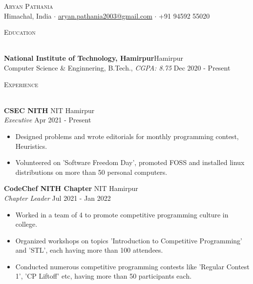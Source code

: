 \documentclass[a4paper]{article}
\newcommand{\lineunder} {
    \vspace*{-8pt} \\
    \hspace*{-18pt} \hrulefill \\
}
\newcommand{\header} [1] {
    {\hspace*{-18pt}\vspace*{6pt} \textsc{#1}}
    \vspace*{-6pt} \lineunder
}
\begin{document}

\begin{center}
	{\Huge \scshape {Aryan Pathania}}\\
	Himachal, India $\cdot$ \href{mailto: aryan.pathania2003@gmail.com}{aryan.pathania2003@gmail.com} $\cdot$ +91 94592 55020\\
\end{center}

\vspace{1.5mm}

\header{Education}
\vspace{1mm}

\textbf{National Institute of Technology, Hamirpur}\hfill Hamirpur\\
Computer Science \& Enginnering, B.Tech., \textit{CGPA: 8.75} \hfill Dec 2020 - Present\\
\vspace{1.5mm}



\header{Experience}
\vspace{1mm}

\textbf{CSEC NITH} \hfill NIT Hamirpur\\
\textit{Executive} \hfill Apr 2021 - Present\\
\begin{itemize}
	\item Designed problems and wrote editorials for monthly programming contest, Heuristics.
	\item Volunteered on 'Software Freedom Day', promoted FOSS and installed linux distributions on more than 50 personal computers.
\end{itemize}
\vspace{1.5mm}

\textbf{CodeChef NITH Chapter} \hfill NIT Hamirpur\\
\textit{Chapter Leader} \hfill Jul 2021 - Jan 2022\\
\begin{itemize}
    \item Worked in a team of 4 to promote competitive programming culture in college.
	\item Organized workshops on topics 'Introduction to Competitive Programming' and 'STL', each having more than 100 attendees.
	\item Conducted numerous competitive programming contests like 'Regular Contest 1', 'CP Liftoff' etc, having more than 50 participants each.
\end{itemize}
\vspace{1.5mm}
\end{document}
